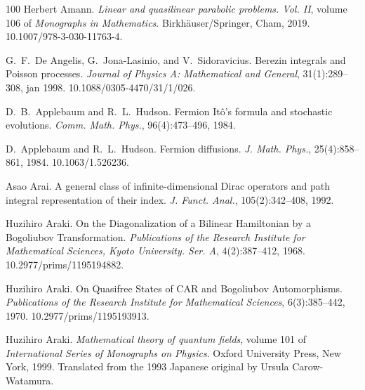 \documentclass{article}
\newcommand{\tmtextit}[1]{{\itshape{#1}}}
\begin{document}
\begin{thebibliography}{100}
  Herbert Amann. {\newblock}\tmtextit{Linear and
  quasilinear parabolic problems. Vol. II},  volume  106  of
  \tmtextit{Monographs in Mathematics}. {\newblock}Birkh{\"a}user/Springer,
  Cham, 2019.
  {\newblock}\href{Https://doi.org/10.1007/978-3-030-11763-4}{}10.1007/978-3-030-11763-4.{\newblock}
  
  G.~F.~De Angelis, G.~Jona-Lasinio, and 
  V.~Sidoravicius. {\newblock}Berezin integrals and Poisson processes.
  {\newblock}\tmtextit{Journal of Physics A: Mathematical and General},
  31(1):289--308, jan 1998.
  {\newblock}\href{Https://doi.org/10.1088/0305-4470/31/1/026}{}10.1088/0305-4470/31/1/026.{\newblock}
  
  D.~B.~Applebaum  and  R.~L.~Hudson.
  {\newblock}Fermion It{\^o}'s formula and stochastic evolutions.
  {\newblock}\tmtextit{Comm. Math. Phys.}, 96(4):473--496, 1984.{\newblock}
  
  D.~Applebaum  and  R.~L.~Hudson. {\newblock}Fermion
  diffusions. {\newblock}\tmtextit{J. Math. Phys.}, 25(4):858--861, 1984.
  {\newblock}\href{Https://doi.org/10.1063/1.526236}{}10.1063/1.526236.{\newblock}
  
  Asao Arai. {\newblock}A general class of
  infinite-dimensional Dirac operators and path integral representation of
  their index. {\newblock}\tmtextit{J. Funct. Anal.}, 105(2):342--408,
  1992.{\newblock}
  
  Huzihiro Araki. {\newblock}On the
  Diagonalization of a Bilinear Hamiltonian by a Bogoliubov Transformation.
  {\newblock}\tmtextit{Publications of the Research Institute for Mathematical
  Sciences, Kyoto University. Ser. A}, 4(2):387--412, 1968.
  {\newblock}\href{Https://doi.org/10.2977/prims/1195194882}{}10.2977/prims/1195194882.{\newblock}
  
  Huzihiro Araki. {\newblock}On Quasifree
  States of CAR and Bogoliubov Automorphisms.
  {\newblock}\tmtextit{Publications of the Research Institute for Mathematical
  Sciences}, 6(3):385--442, 1970.
  {\newblock}\href{Https://doi.org/10.2977/prims/1195193913}{}10.2977/prims/1195193913.{\newblock}
  
  Huzihiro Araki. {\newblock}\tmtextit{Mathematical
  theory of quantum fields},  volume  101  of \tmtextit{International Series
  of Monographs on Physics}. {\newblock}Oxford University Press, New York,
  1999. {\newblock}Translated from the 1993 Japanese original by Ursula
  Carow-Watamura.{\newblock}
  

\end{thebibliography}
\end{document}
